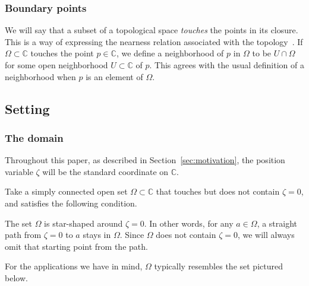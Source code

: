 \documentclass[final]{siamart220329}
\makeatletter
\newcommand{\cond}[1]{\item[(\textsc{#1})]\protected@edef\@currentlabel{\textsc{#1}}}
\newcommand{\C}{\mathbb{C}}
\newcommand{\domain}{\Omega}
\makeatother
\begin{document}
\subsubsection{Boundary points}
We will say that a subset of a topological space {\em touches} the points in its closure. This is a way of expressing the nearness relation associated with the topology~\cite[Chapter~5, Definition~2.11]{joshi1983gen-top}. If $\Omega \subset \C$ touches the point $p \in \C$, we define a neighborhood of $p$ in $\Omega$ to be $U \cap \Omega$ for some open neighborhood $U \subset \C$ of $p$. This agrees with the usual definition of a neighborhood when $p$ is an element of $\Omega$.
\subsection{Setting}\label{setting}
\subsubsection{The domain}\label{setting:domain}
Throughout this paper, as described in Section~\ref{sec:motivation}, the position variable $\zeta$ will be the standard coordinate on $\C$. 

Take a simply connected open set $\domain \subset \C$ that touches but does not contain $\zeta = 0$, and satisfies the following condition.
\begin{conditions}
\cond{star}\label{cond:star} The set $\domain$ is star-shaped around $\zeta = 0$. In other words, for any $a \in \domain$, a straight path from $\zeta = 0$ to $a$ stays in $\domain$. Since $\domain$ does not contain $\zeta = 0$, we will always omit that starting point from the path.
\end{conditions}
For the applications we have in mind, $\domain$ typically resembles the set pictured below.
\vspace{2mm}

\begin{center}
\end{center}
\end{document}
